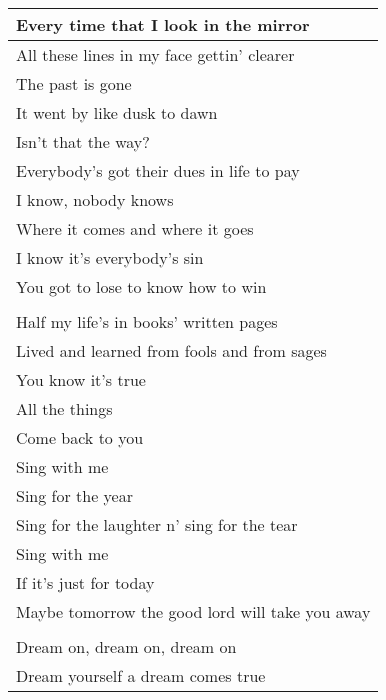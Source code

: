 \begin{longtable}{@{}l@{}}
\toprule
Every time that I look in the mirror            \\* \midrule
\endfirsthead
%
\endhead
%
\bottomrule
\endfoot
%
\endlastfoot
%
All these lines in my face gettin' clearer      \\
The past is gone                                \\
It went by like dusk to dawn                    \\
Isn't that the way?                             \\
Everybody's got their dues in life to pay       \\
I know, nobody knows                            \\
Where it comes and where it goes                \\
I know it's everybody's sin                     \\
You got to lose to know how to win              \\
                                                \\
Half my life's in books' written pages          \\
Lived and learned from fools and from sages     \\
You know it's true                              \\
All the things                                  \\
Come back to you                                \\
Sing with me                                    \\
Sing for the year                               \\
Sing for the laughter n' sing for the tear      \\
Sing with me                                    \\
If it's just for today                          \\
Maybe tomorrow the good lord will take you away \\
                                                \\
Dream on, dream on, dream on                    \\
Dream yourself a dream comes true               \\

\end{longtable}
